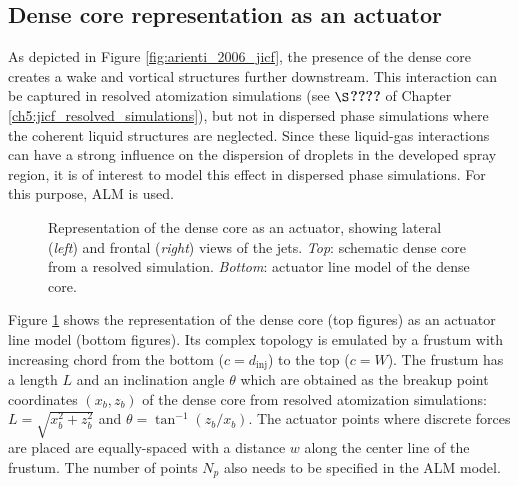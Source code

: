 

\subsection{Dense core representation as an actuator}


As depicted in Figure \ref{fig:arienti_2006_jicf}, the presence of the dense core creates a wake and vortical structures further downstream. This interaction can be captured in resolved atomization simulations (see $\S$\textbf{????} of Chapter \ref{ch5:jicf_resolved_simulations}), but not in dispersed phase simulations where the coherent liquid structures are neglected. Since these liquid-gas interactions can have a strong influence on the dispersion of droplets in the developed spray region, it is of interest to model this effect in dispersed phase simulations. For this purpose, ALM is used.

\begin{figure}[h!]	
	\centering
	\caption[Representation of the dense core as an actuator]{Representation of the dense core as an actuator, showing lateral (\textsl{left}) and frontal (\textsl{right}) views of the jets. \textsl{Top}: schematic dense core from a resolved simulation. \textsl{Bottom}: actuator line model of the dense core.}
	\label{fig:ALM_DC_learning}
\end{figure}

Figure \ref{fig:ALM_DC_learning} shows the representation of the dense core (top figures) as an actuator line model (bottom figures). Its complex topology is emulated by a frustum with increasing chord from the bottom ($c = d_\mathrm{inj}$) to the top ($c = W$). The frustum has a length $L$ and an inclination angle $\theta$ which are obtained as the breakup point coordinates $(x_b, z_b)$ of the dense core from resolved atomization simulations: $L = \sqrt{x_b^2 + z_b^2}$ and $\theta = \tan^{-1} \left( z_b / x_b\right)$. The actuator points where discrete forces are placed are equally-spaced with a distance $w$ along the center line of the frustum. The number of points $N_p$ also needs to be specified in the ALM model.

